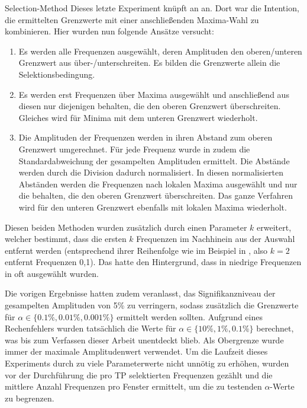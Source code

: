     \begin{experiment}{Selection-Method} %
        \label{exp:selection_method}
        Dieses letzte Experiment knüpft an  an. Dort war die Intention, die ermittelten Grenzwerte mit einer anschließenden Maxima-Wahl zu kombinieren. Hier wurden nun folgende Ansätze versucht:
    
        \begin{enumerate}
            \item Es werden alle Frequenzen ausgewählt, deren Amplituden den oberen/unteren Grenzwert aus  über-/unterschreiten. Es bilden die Grenzwerte allein die Selektionsbedingung.
            \item Es werden erst Frequenzen über Maxima ausgewählt und anschließend aus diesen nur diejenigen behalten, die den oberen Grenzwert überschreiten. Gleiches wird für Minima mit dem unteren Grenzwert wiederholt.
            \item Die Amplituden der Frequenzen werden in ihren Abstand zum oberen Grenzwert umgerechnet. Für jede Frequenz wurde in  zudem die Standardabweichung der gesampelten Amplituden ermittelt. Die Abstände werden durch die Division dadurch normalisiert. In diesen normalisierten Abständen werden die Frequenzen nach lokalen Maxima ausgewählt und nur die behalten, die den oberen Grenzwert überschreiten. Das ganze Verfahren wird für den unteren Grenzwert ebenfalls mit lokalen Maxima wiederholt.
        \end{enumerate}

        Diesen beiden Methoden wurden zusätzlich durch einen Parameter $k$ erweitert, welcher bestimmt, dass die ersten $k$ Frequenzen im Nachhinein aus der Auswahl entfernt werden (entsprechend ihrer Reihenfolge wie im Beispiel in , also $k=2$ entfernt Frequenzen 0,1). Das hatte den Hintergrund, dass in niedrige Frequenzen in  oft ausgewählt wurden.

        Die vorigen Ergebnisse hatten zudem veranlasst, das Signifikanzniveau der gesampelten Amplituden von 5\% zu verringern, sodass zusätzlich die Grenzwerte für $\alpha \in \{0.1\%, 0.01\%, 0.001\%\}$ ermittelt werden sollten. Aufgrund eines Rechenfehlers wurden tatsächlich die Werte für $\alpha \in \{10\%, 1\%, 0.1\%\}$ berechnet, was bis zum Verfassen dieser Arbeit unentdeckt blieb. Als Obergrenze wurde immer der maximale Amplitudenwert verwendet. Um die Laufzeit dieses Experiments durch zu viele Parameterwerte nicht unnötig zu erhöhen, wurden vor der Durchführung die pro \ac{TP} selektierten Frequenzen gezählt und die mittlere Anzahl Frequenzen pro Fenster ermittelt, um die zu testenden $\alpha$-Werte zu begrenzen.


\end{experiment}
